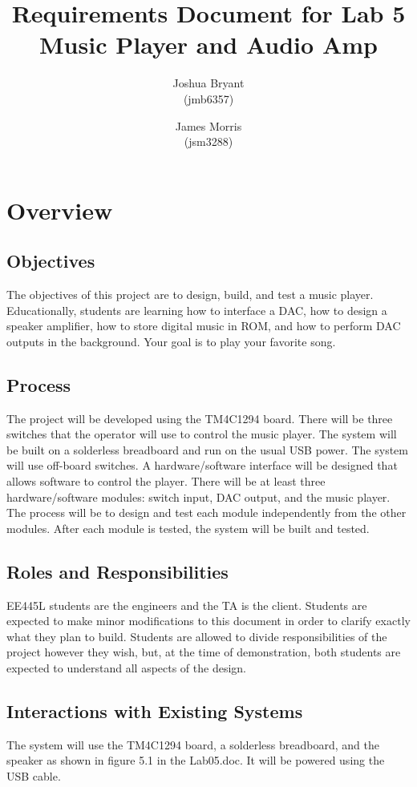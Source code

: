 \documentclass{article}
\begin{document}
\title{Requirements Document for Lab 5 Music Player and Audio Amp}
\author{Joshua Bryant \\(jmb6357) \and James Morris \\(jsm3288)}

\maketitle

\section{Overview}

	\subsection{Objectives}
		The objectives of this project are to design, build, and test a music player. Educationally, students are learning how to interface a DAC, how to design a speaker amplifier, how to store digital music in ROM, and how to perform DAC outputs in the background. Your goal is to play your favorite song.
	\subsection{Process}
		The project will be developed using the TM4C1294 board. There will be three switches that the operator will use to control the music player. The system will be built on a solderless breadboard and run on the usual USB power. The system will use off-board switches. A hardware/software interface will be designed that allows software to control the player. There will be at least three hardware/software modules: switch input, DAC output, and the music player. The process will be to design and test each module independently from the other modules. After each module is tested, the system will be built and tested.
	\subsection{Roles and Responsibilities}
		EE445L students are the engineers and the TA is the client. Students are expected to make minor modifications to this document in order to clarify exactly what they plan to build. Students are allowed to divide responsibilities of the project however they wish, but, at the time of demonstration, both students are expected to understand all aspects of the design.
	\subsection{Interactions with Existing Systems}
		The system will use the TM4C1294 board, a solderless breadboard, and the speaker as shown in figure 5.1 in the Lab05.doc. It will be powered using the USB cable.
\end{document}
